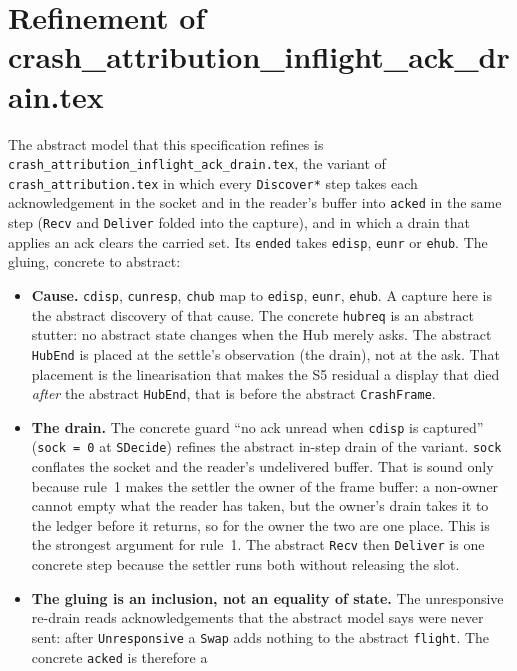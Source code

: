 \documentclass[a4paper,10pt,fleqn]{article}
\begin{document}
\section{Refinement of crash\_attribution\_inflight\_ack\_drain.tex}

The abstract model that this specification refines is
\texttt{crash\_attribution\_inflight\_ack\_drain.tex}, the variant of
\texttt{crash\_attribution.tex} in which every \texttt{Discover*} step takes each
acknowledgement in the socket and in the reader's buffer into \texttt{acked} in
the same step (\texttt{Recv} and \texttt{Deliver} folded into the capture), and
in which a drain that applies an ack clears the carried set.  Its \texttt{ended}
takes \texttt{edisp}, \texttt{eunr} or \texttt{ehub}.  The gluing, concrete to
abstract:

\begin{itemize}
  \item \textbf{Cause.}  \texttt{cdisp}, \texttt{cunresp}, \texttt{chub} map to
    \texttt{edisp}, \texttt{eunr}, \texttt{ehub}.  A capture here is the abstract
    discovery of that cause.  The concrete \texttt{hubreq} is an abstract
    stutter: no abstract state changes when the Hub merely asks.  The abstract
    \texttt{HubEnd} is placed at the settle's observation (the drain), not at the
    ask.  That placement is the linearisation that makes the S5 residual a
    display that died \emph{after} the abstract \texttt{HubEnd}, that is before
    the abstract \texttt{CrashFrame}.
  \item \textbf{The drain.}  The concrete guard ``no ack unread when
    \texttt{cdisp} is captured'' (\texttt{sock = 0} at \texttt{SDecide}) refines
    the abstract in-step drain of the variant.  \texttt{sock} conflates the socket
    and the reader's undelivered buffer.  That is sound only because rule~1 makes
    the settler the owner of the frame buffer: a non-owner cannot empty what the
    reader has taken, but the owner's drain takes it to the ledger before it
    returns, so for the owner the two are one place.  This is the strongest
    argument for rule~1.  The abstract \texttt{Recv} then \texttt{Deliver} is one
    concrete step because the settler runs both without releasing the slot.
  \item \textbf{The gluing is an inclusion, not an equality of state.}  The
    unresponsive re-drain reads acknowledgements that the abstract model says
    were never sent: after \texttt{Unresponsive} a \texttt{Swap} adds nothing to
    the abstract \texttt{flight}.  The concrete \texttt{acked} is therefore a

\end{itemize}
\end{document}
